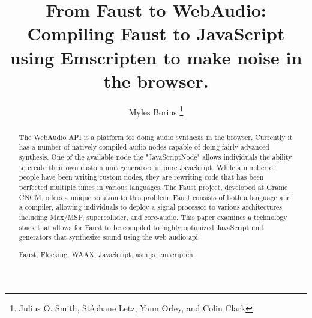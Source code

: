 \documentclass[runningheads,a4paper]{llncs}
\newcommand{\keywords}[1]{\par\addvspace\baselineskip
\noindent\keywordname\enspace\ignorespaces#1}
\begin{document}
\mainmatter  %

\title{From Faust to WebAudio: Compiling Faust to JavaScript using Emscripten to make noise in the browser.}


%
%
\author{Myles Borins \thanks{Julius O. Smith, Stéphane Letz, Yann Orley, and Colin Clark}}
%


%
%


\maketitle


\begin{abstract}
The WebAudio API is a platform for doing audio synthesis in the browser.  Currently it has a number of natively compiled audio nodes capable of doing fairly advanced synthesis.  One of the available node the "JavaScriptNode" allows individuals the ability to create their own custom unit generators in pure JavaScript. While a number of people have been writing custom nodes, they are rewriting code that has been perfected multiple times in various languages. The Faust project, developed at Grame CNCM, offers a unique solution to this problem.  Faust consists of both a language and a compiler, allowing individuals to deploy a signal processor to various architectures including Max/MSP, supercollider, and core-audio.  This paper examines a technology stack that allows for Faust to be compiled to highly optimized JavaScript unit generators that synthesize sound using the web audio api.  


\keywords{Faust, Flocking, WAAX, JavaScript, asm.js, emscripten}
\end{abstract}
\end{document}
